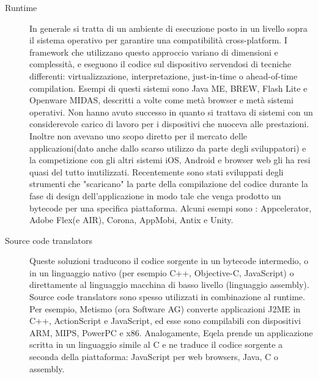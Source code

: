 \begin{description}
\item[Runtime] In generale si tratta di un ambiente di esecuzione posto in un livello sopra il sistema operativo per garantire una compatibilità cross-platform. I framework che utilizzano questo approccio variano di dimensioni e complessità, e eseguono il codice sul dispositivo servendosi di tecniche differenti: virtualizzazione, interpretazione, just-in-time o ahead-of-time compilation. Esempi di questi sistemi sono Java ME, BREW, Flash Lite e Openware MIDAS, descritti a volte come metà browser e metà sistemi operativi.
Non hanno avuto successo in quanto si trattava di sistemi con un considerevole carico di lavoro per i dispositivi che nuoceva alle prestazioni. Inoltre non avevano uno scopo diretto per il mercato delle applicazioni(dato anche dallo scarso utilizzo da parte degli sviluppatori) e la competizione con gli altri sistemi iOS, Android e browser web gli ha resi quasi del tutto inutilizzati.
Recentemente sono stati sviluppati degli strumenti che "scaricano" la parte della compilazione del codice durante la fase di design dell'applicazione in modo tale che venga prodotto un bytecode per una specifica piattaforma. Alcuni esempi sono : Appcelerator, Adobe Flex(e AIR), Corona, AppMobi, Antix e Unity.

\item[Source code translators]
Queste soluzioni traducono il codice sorgente in un bytecode intermedio, o in un linguaggio nativo (per esempio C++, Objective-C, JavaScript) o direttamente al linguaggio macchina di basso livello (linguaggio assembly). Source code translators sono spesso utilizzati in combinazione al runtime. Per esempio, Metismo (ora Software AG) converte applicazioni J2ME in C++, ActionScript e JavaScript, ed esse sono compilabili con dispositivi ARM, MIPS, PowerPC e x86. Analogamente, Eqela prende un applicazione scritta in un linguaggio simile al C e ne traduce il codice sorgente a seconda della piattaforma: JavaScript per web browsers, Java, C o assembly. 
\end{description}

